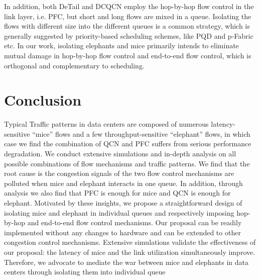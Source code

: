 \documentclass[]{sig-alternate-10pt}
\begin{document}
In addition, both DeTail \cite{zats2012detail} and DCQCN \cite{zhu2015congestion} employ the hop-by-hop flow control in the link layer, i.e. PFC, but short and long flows are mixed in a queue. Isolating the flows with different size into the different queues is a common strategy, which is generally suggested by priority-based scheduling schemes, like PQD \cite{wilson2011better} and p-Fabric \cite{alizadeh2013pfabric} etc. In our work, isolating elephants and mice primarily intends to eliminate mutual damage in hop-by-hop flow control and end-to-end flow control, which is orthogonal and complementary to scheduling.
 \section{Conclusion}
\label{conclusion}
Typical Traffic patterns in data centers are composed of numerous latency-sensitive ``mice'' flows and a few throughput-sensitive ``elephant'' flows, in which case we find the combination of QCN and PFC suffers from serious performance degradation. We conduct extensive simulations and in-depth analysis on all possible combinations of flow mechanisms and traffic patterns. We find that the root cause is the congestion signals of the two flow control mechanisms are polluted when mice and elephant interacts in one queue. In addition, through analysis we also find that PFC is enough for mice and QCN is enough for elephant.
Motivated by these insights, we propose a straightforward design of isolating mice and elephant in individual queues and respectively imposing hop-by-hop and end-to-end flow control mechanisms. Our proposal can be readily implemented without any changes to hardware and can be extended to other congestion control mechanisms. Extensive simulations validate the effectiveness of our proposal: the latency of mice and the link utilization simultaneously improve. Therefore,  we advocate to mediate the war between mice and elephants in data centers through isolating them into individual queue
 


\end{document}
